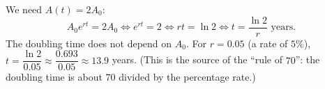 We need $A(t)=2A_0$:
\[A_0e^{rt}=2A_0\iff e^{rt}=2\iff rt=\ln2\iff t=\boxed{\dfrac{\ln2}{r}}\text{ years}.\]
The doubling time does not depend on $A_0$. For $r=0.05$ (a rate of $5\%$), $t=\dfrac{\ln2}{0.05}\approx\dfrac{0.693}{0.05}\approx\boxed{13.9}$ years. (This is the source of the ``rule of $70$'': the doubling time is about $70$ divided by the percentage rate.)

